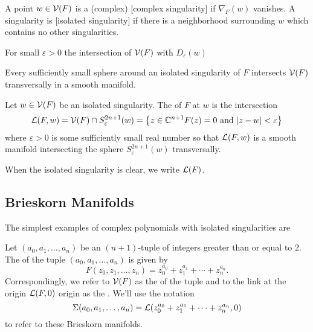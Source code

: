 \begin{definition}
	A point $w\in \mathcal{V}(F)$ is a (complex) [complex singularity] if $\nabla_F(w)$ vanishes. A singularity is [isolated singularity] if there is a neighborhood surrounding $w$ which contains no other singularities.
\end{definition}

\begin{theorem}
	For small $\varepsilon>0$ the intersection of $\mathcal{V}(F)$ with $D_\varepsilon(w)$
\end{theorem}

\begin{proposition}
	Every sufficiently small sphere around an isolated singularity of $F$ intersects $\mathcal{V}(F)$ transversally in a smooth manifold.
\end{proposition}

\begin{definition}
	Let $w\in \mathcal{V}(F)$ be an isolated singularity. The  of $F$ at $w$ is the intersection
	\[
		\mathcal{L}(F, w) = \mathcal{V}(F) \cap S^{2n+1}_\varepsilon(w) = \left\{ z\in \mathbb{C}^{n+1}  F(z)=0\textrm{ and } |z-w|<\varepsilon\right\}
	\]
	where $\varepsilon > 0$ is some sufficiently small real number so that $\mathcal{L}(F,w)$ is a smooth manifold intersecting the sphere $S^{2n+1}_\varepsilon(w)$ transversally.
\end{definition}

When the isolated singularity is clear, we write $\mathcal{L}(F)$.

\subsection{Brieskorn Manifolds}
The simplest examples of complex polynomials with isolated singularities are 

\begin{definition}
	Let $(a_0,a_1,\ldots, a_n)$ be an $(n+1)$-tuple of integers greater than or equal to $2$. The  of the tuple $(a_0,a_1,\ldots, a_n)$ is given by
	\[
		F(z_0,z_1,\ldots, z_n) = z_0^{a_0} + z_1^{a_1} +\cdots + z_n^{a_n}.
	\]
	Correspondingly, we refer to $\mathcal{V}(F)$ as the  of the tuple and to the link at the origin $\mathcal{L}(F,0)$ origin as the . We'll use the notation
	\[
		\Sigma(a_0,a_1,\ldots, a_n) =\mathcal{L}(z_0^{a_0}+z_1^{a_1}+\cdots+z_n^{a_n}, 0)
	\]
	to refer to these Brieskorn manifolds.
\end{definition}


